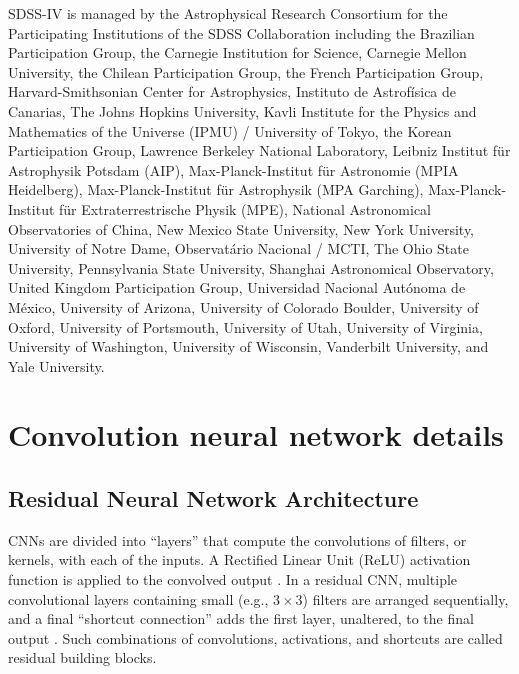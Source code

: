 \documentclass[fleqn,usenatbib]{mnras}
\begin{document}
SDSS-IV is managed by the Astrophysical Research Consortium for the 
Participating Institutions of the SDSS Collaboration including the 
Brazilian Participation Group, the Carnegie Institution for Science, 
Carnegie Mellon University, the Chilean Participation Group, the French Participation Group, Harvard-Smithsonian Center for Astrophysics, 
Instituto de Astrof\'isica de Canarias, The Johns Hopkins University, 
Kavli Institute for the Physics and Mathematics of the Universe (IPMU) / 
University of Tokyo, the Korean Participation Group, Lawrence Berkeley National Laboratory, 
Leibniz Institut f\"ur Astrophysik Potsdam (AIP),  
Max-Planck-Institut f\"ur Astronomie (MPIA Heidelberg), 
Max-Planck-Institut f\"ur Astrophysik (MPA Garching), 
Max-Planck-Institut f\"ur Extraterrestrische Physik (MPE), 
National Astronomical Observatories of China, New Mexico State University, 
New York University, University of Notre Dame, 
Observat\'ario Nacional / MCTI, The Ohio State University, 
Pennsylvania State University, Shanghai Astronomical Observatory, 
United Kingdom Participation Group,
Universidad Nacional Aut\'onoma de M\'exico, University of Arizona, 
University of Colorado Boulder, University of Oxford, University of Portsmouth, 
University of Utah, University of Virginia, University of Washington, University of Wisconsin, 
Vanderbilt University, and Yale University.





\appendix
%
\section{Convolution neural network details}

\subsection{Residual Neural Network Architecture}
CNNs are divided into ``layers'' that compute the convolutions of filters, or kernels, with each of the inputs.
A Rectified Linear Unit (ReLU) activation function is applied to the convolved output \citep[ReLUs have been shown to propagate information about the relative importances of different features, and are effective for training deep neural networks;][]{Nair2010}.
In a residual CNN, multiple convolutional layers containing small (e.g., $3\times 3$) filters are arranged sequentially, and a final ``shortcut connection'' adds the first layer, unaltered, to the final output \citep[before the final ReLU activation; see, e.g., Figure~2 of][]{He2015}.
Such combinations of convolutions, activations, and shortcuts are called residual building blocks.
\end{document}
